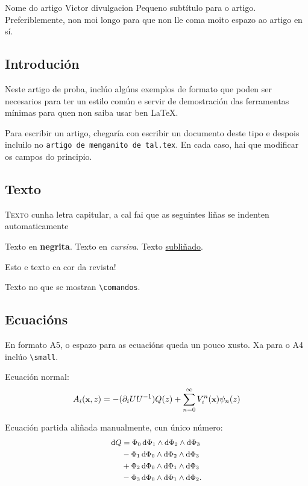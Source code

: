 \titular%
{Nome do artigo}
{Victor}
{divulgacion}
{
Pequeno subtítulo para o artigo. Preferiblemente, non moi longo para que non
lle coma moito espazo ao artigo en sí.
}

\subsection*{Introdución}

Neste artigo de proba, inclúo algúns exemplos de formato que poden ser
necesarios para ter un estilo común e servir de demostración das ferramentas
mínimas para quen non saiba usar ben \LaTeX.

Para escribir un artigo, chegaría con escribir un documento deste tipo e
despois incluilo no \texttt{artigo de menganito de tal.tex}. En cada caso, hai
que modificar os campos do principio.

\subsection*{Texto} %

\lettrine[lraise=0.1, lines=2]{T}{exto}%
cunha letra capitular, a cal fai que as seguintes liñas se indenten
automaticamente

Texto en \textbf{negrita}.
Texto en \textit{cursiva}.
Texto \underline{subliñado}.

{\color{Resalte}Esto e texto ca cor da revista!}

Texto no que se mostran \verb+\comandos+.

\subsection*{Ecuacións} %

En formato A5, o espazo para as ecuacións queda un pouco xusto. Xa para o A4
inclúo \verb+\small+.

Ecuación normal:
\begin{equation} \small
    A_i(\textbf{x},z)
    =
    -(\partial_i U U^{-1})Q(z) + \sum_{n= 0}^\infty V^n_i(\textbf{x}) \psi_n(z)
    \label{eq:a_tower}
\end{equation}

Ecuación partida aliñada manualmente, cun único número:
\begin{equation}\small
    \begin{split} %
        \text{d} Q &= \Phi_0 \, \text{d}\Phi_1 \wedge \text{d}\Phi_2 \wedge \text{d}\Phi_3 \\
        &- \Phi_1 \, \text{d}\Phi_0 \wedge \text{d}\Phi_2 \wedge \text{d}\Phi_3 \\
        &+ \Phi_2 \, \text{d}\Phi_0 \wedge \text{d}\Phi_1 \wedge \text{d}\Phi_3 \\
        &- \Phi_3 \, \text{d}\Phi_0 \wedge \text{d}\Phi_1 \wedge \text{d}\Phi_2.
        \label{eq:dQ_phi}
    \end{split}
\end{equation}

